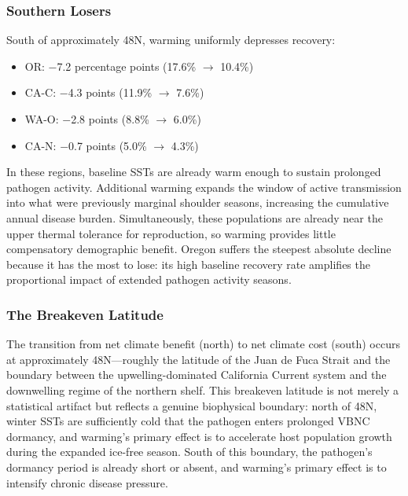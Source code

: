 \subsubsection{Southern Losers}

South of approximately 48\textdegree N, warming uniformly depresses
recovery:

\begin{itemize}
  \item OR: $-$7.2 percentage points (17.6\% $\rightarrow$ 10.4\%)
  \item CA-C: $-$4.3 points (11.9\% $\rightarrow$ 7.6\%)
  \item WA-O: $-$2.8 points (8.8\% $\rightarrow$ 6.0\%)
  \item CA-N: $-$0.7 points (5.0\% $\rightarrow$ 4.3\%)
\end{itemize}

\noindent
In these regions, baseline SSTs are already warm enough to sustain
prolonged pathogen activity.  Additional warming expands the window of
active transmission into what were previously marginal shoulder
seasons, increasing the cumulative annual disease burden.
Simultaneously, these populations are already near the upper thermal
tolerance for reproduction, so warming provides little compensatory
demographic benefit.  Oregon suffers the steepest absolute decline
because it has the most to lose: its high baseline recovery rate
amplifies the proportional impact of extended pathogen activity seasons.

\subsubsection{The Breakeven Latitude}

The transition from net climate benefit (north) to net climate cost
(south) occurs at approximately 48\textdegree N---roughly the latitude
of the Juan de Fuca Strait and the boundary between the
upwelling-dominated California Current system and the downwelling
regime of the northern shelf.  This breakeven latitude is not merely a
statistical artifact but reflects a genuine biophysical boundary: north
of 48\textdegree N, winter SSTs are sufficiently cold that the pathogen
enters prolonged VBNC dormancy, and warming's primary effect is to
accelerate host population growth during the expanded ice-free season.
South of this boundary, the pathogen's dormancy period is already short
or absent, and warming's primary effect is to intensify chronic disease
pressure.

